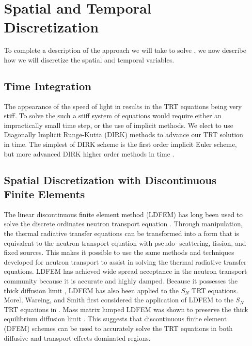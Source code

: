 \section{Spatial and Temporal Discretization}

To complete a description of the approach we will take to solve , we now describe how we will discretize the spatial and temporal variables.

\subsection{Time Integration}

The appearance of the speed of light in  results in the TRT equations being very stiff.
To solve the such a stiff system of equations would require either an impractically small time step, or the use of implicit methods.
We elect to use Diagonally Implicit Runge-Kutta (DIRK) methods to advance our TRT solution in time.
The simplest of DIRK scheme is the first order implicit Euler scheme, but more advanced DIRK higher order methods in time \cite{alexander}.

\subsection{Spatial Discretization with Discontinuous Finite Elements}

The linear discontinuous finite element method (LDFEM) has long been used to solve the discrete ordinates neutron transport equation \cite{reed}.
Through manipulation, the thermal radiative transfer equations can be transformed  into a form that is equivalent to the neutron transport equation with pseudo- scattering, fission, and fixed sources.
This makes it possible to use the same methods and techniques developed for neutron transport to assist in solving the  thermal radiative transfer equations.
LDFEM has achieved wide spread acceptance in the neutron transport community because it is accurate \cite{larsen_nelson} and highly damped.  
Because it possesses the thick diffusion limit \cite{larsen_morel_asymptotics}, LDFEM has also been applied to the $S_N$ TRT equations.  
Morel, Wareing, and Smith first considered the application of LDFEM to the $S_N$ TRT equations in \cite{morel_radtran}.
Mass matrix lumped LDFEM was shown to preserve the thick equilibrium diffusion limit \cite{morel_radtran}.  
This suggests that discontinuous finite element (DFEM) schemes can be used to accurately solve the TRT equations in both diffusive and transport effects dominated regions.

